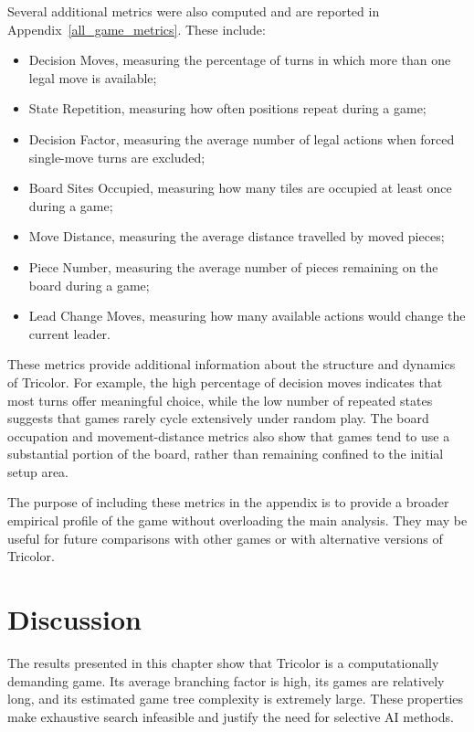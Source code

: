 Several additional metrics were also computed and are reported in Appendix~\ref{all_game_metrics}. These include:

\begin{itemize}
    \item Decision Moves, measuring the percentage of turns in which more than one legal move is available;
    \item State Repetition, measuring how often positions repeat during a game;
    \item Decision Factor, measuring the average number of legal actions when forced single-move turns are excluded;
    \item Board Sites Occupied, measuring how many tiles are occupied at least once during a game;
    \item Move Distance, measuring the average distance travelled by moved pieces;
    \item Piece Number, measuring the average number of pieces remaining on the board during a game;
    \item Lead Change Moves, measuring how many available actions would change the current leader.
\end{itemize}

These metrics provide additional information about the structure and dynamics of Tricolor. For example, the high percentage of decision moves indicates that most turns offer meaningful choice, while the low number of repeated states suggests that games rarely cycle extensively under random play. The board occupation and movement-distance metrics also show that games tend to use a substantial portion of the board, rather than remaining confined to the initial setup area.

The purpose of including these metrics in the appendix is to provide a broader empirical profile of the game without overloading the main analysis. They may be useful for future comparisons with other games or with alternative versions of Tricolor.

\section{Discussion}

The results presented in this chapter show that Tricolor is a computationally demanding game. Its average branching factor is high, its games are relatively long, and its estimated game tree complexity is extremely large. These properties make exhaustive search infeasible and justify the need for selective AI methods.

